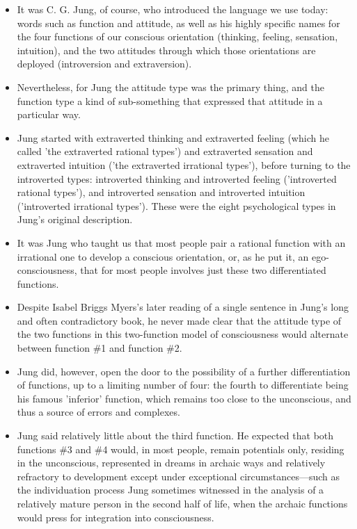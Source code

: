 \begin{itemize}

\item It was C. G. Jung, of course, who introduced the language we use today:
words such as function and attitude, as well as his highly specific names for
the four functions of our conscious orientation (thinking, feeling, sensation,
intuition), and the two attitudes through which those orientations are deployed
(introversion and extraversion).

\item Nevertheless, for Jung the attitude type was the primary thing, and the
function type a kind of sub-something that expressed that attitude in a
particular way.

\item Jung started with extraverted thinking and extraverted feeling (which he
called 'the extraverted rational types') and extraverted sensation and
extraverted intuition ('the extraverted irrational types'), before turning to
the introverted types: introverted thinking and introverted feeling
('introverted rational types'), and introverted sensation and introverted
intuition ('introverted irrational types'). These were the eight psychological
types in Jung's original description.

\item It was Jung who taught us that most people pair a rational function with
an irrational one to develop a conscious orientation, or, as he put it, an
ego-consciousness, that for most people involves just these two differentiated
functions.

\item Despite Isabel Briggs Myers's later reading of a single sentence in
Jung's long and often contradictory book, he never made clear that the attitude
type of the two functions in this two-function model of consciousness would
alternate between function \#1 and function \#2.

\item Jung did, however, open the door to the possibility of a further
differentiation of functions, up to a limiting number of four: the fourth to
differentiate being his famous 'inferior' function, which remains too close to
the unconscious, and thus a source of errors and complexes.

\item Jung said relatively little about the third function. He expected that
both functions \#3 and \#4 would, in most people, remain potentials only,
residing in the unconscious, represented in dreams in archaic ways and
relatively refractory to development except under exceptional
circumstances—such as the individuation process Jung sometimes witnessed in the
analysis of a relatively mature person in the second half of life, when the
archaic functions would press for integration into consciousness.

\end{itemize}

